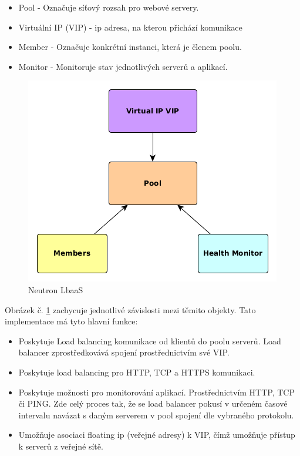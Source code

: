 \begin{itemize}
\item Pool - Označuje síťový rozsah pro webové servery.
\item Virtuální IP (VIP) - ip adresa, na kterou přichází komunikace
\item Member - Označuje konkrétní instanci, která je členem poolu.
\item Monitor - Monitoruje stav jednotlivých serverů a aplikací.
\end{itemize}

\begin{figure}[h]
\begin{centering}
\includegraphics[scale=0.63]{images/NeutronLbaaS}
\par\end{centering}
\caption{Neutron LbaaS\label{fig:NeutronLbaaS}}
\end{figure}

Obrázek č. \ref{fig:NeutronLbaaS} zachycuje jednotlivé závislosti mezi těmito objekty. Tato implementace má tyto hlavní funkce:

\begin{itemize}
\item Poskytuje Load balancing komunikace od klientů do poolu serverů. Load balancer zprostředkovává spojení prostřednictvím své VIP.
\item Poskytuje load balancing pro HTTP, TCP a HTTPS komunikaci.
\item Poskytuje možnosti pro monitorování aplikací. Prostřednictvím HTTP, TCP či PING. Zde celý proces tak, že se load balancer pokusí v určeném časové intervalu navázat s daným serverem v pool spojení dle vybraného protokolu.
\item Umožňuje asociaci floating ip (veřejné adresy) k VIP, čímž umožňuje přístup k serverů z veřejné sítě.
\end{itemize}

